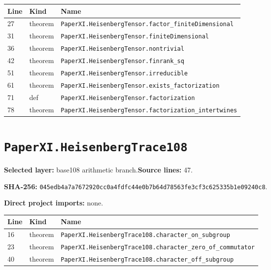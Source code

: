 \documentclass[10pt,oneside]{book}
\begin{document}
\begin{longtable}{@{}p{}p{}p{}@{}}\toprule Line&Kind&Name\\\midrule\endhead

27&theorem&\nolinkurl{PaperXI.HeisenbergTensor.factor_finiteDimensional}\\

31&theorem&\nolinkurl{PaperXI.HeisenbergTensor.finiteDimensional}\\

36&theorem&\nolinkurl{PaperXI.HeisenbergTensor.nontrivial}\\

42&theorem&\nolinkurl{PaperXI.HeisenbergTensor.finrank_sq}\\

51&theorem&\nolinkurl{PaperXI.HeisenbergTensor.irreducible}\\

61&theorem&\nolinkurl{PaperXI.HeisenbergTensor.exists_factorization}\\

71&def&\nolinkurl{PaperXI.HeisenbergTensor.factorization}\\

78&theorem&\nolinkurl{PaperXI.HeisenbergTensor.factorization_intertwines}\\

\bottomrule\end{longtable}

\section{\texorpdfstring{\nolinkurl{PaperXI.HeisenbergTrace108}}{PaperXI.HeisenbergTrace108}}\label{module:PaperXI.HeisenbergTrace108}

\textbf{Selected layer:} base108 arithmetic branch.\quad\textbf{Source lines:} 47.\par\textbf{SHA-256:} {\scriptsize\nolinkurl{045edb4a7a7672920cc0a4fdfc44e0b7b64d78563fe3cf3c625335b1e09240c8}}.


\textbf{Direct project imports:} none.

\begin{longtable}{@{}p{}p{}p{}@{}}\toprule Line&Kind&Name\\\midrule\endhead

16&theorem&\nolinkurl{PaperXI.HeisenbergTrace108.character_on_subgroup}\\

23&theorem&\nolinkurl{PaperXI.HeisenbergTrace108.character_zero_of_commutator}\\

40&theorem&\nolinkurl{PaperXI.HeisenbergTrace108.character_off_subgroup}\\

\bottomrule\end{longtable}
\end{document}
